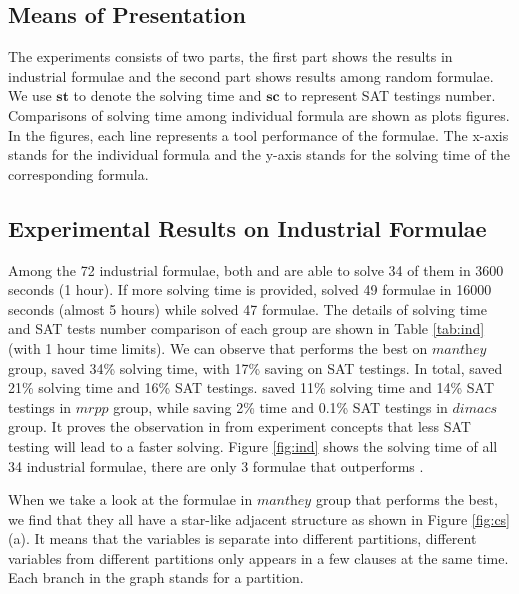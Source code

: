 \subsection{Means of Presentation}
The experiments consists of two parts, the first part shows the results in industrial formulae and the second part shows results among random formulae.
We use $\textbf{st}$ to denote the solving time and $\textbf{sc}$ to represent SAT testings number.
Comparisons of solving time among individual formula are shown as plots figures. In the figures, each line represents a tool performance of the formulae. The x-axis stands for the individual formula and the y-axis stands for the solving time of the corresponding formula.

\subsection{Experimental Results on Industrial Formulae}\label{sec:ind_expr}
Among the 72 industrial formulae, both \tool and \minibones are able to solve 34 of them in 3600 seconds (1 hour).
If more solving time is provided, \tool solved 49 formulae in 16000 seconds (almost 5 hours) while \minibones solved 47 formulae.
The details of solving time and SAT tests number comparison of each group are shown in Table \ref{tab:ind} (with 1 hour time limits). We can observe that \tool performs the best on $\textit{manthey}$ group, saved 34\% solving time, with 17\% saving on SAT testings. In total, \tool saved 21\% solving time and 16\% SAT testings. \tool saved 11\% solving time and 14\% SAT testings in $\textit{mrpp}$ group, while saving 2\% time and 0.1\% SAT testings in $\textit{dimacs}$ group. It proves the observation in \cite{JLM15} from experiment concepts that less SAT testing will lead to a faster solving.
Figure \ref{fig:ind} shows the solving time of all 34 industrial formulae, there are only 3 formulae that \minibones outperforms \tool.

When we take a look at the formulae in $\textit{manthey}$ group that \tool performs the best, we find that they all have a star-like adjacent structure as shown in Figure \ref{fig:cs}(a). It means that the variables is separate into different partitions, different variables from different partitions only appears in a few clauses at the same time. Each branch in the graph stands for a partition.



